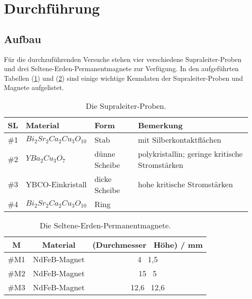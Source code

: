 \section{Durchf\"uhrung}
\label{sec:durchfuehrung}
\subsection{Aufbau}
F\"ur die durchzuf\"uhrenden Versuche stehen vier verschiedene Supraleiter-Proben und drei Seltene-Erden-Permanentmagnete zur Verf\"ugung.
In den aufgef\"uhrten Tabellen (\ref{tab:probenSL}) und (\ref{tab:probenM}) sind einige wichtige Kenndaten der Supraleiter-Proben und Magnete aufgelistet.
\begin{table}
	\centering
	\caption{Die Supraleiter-Proben.}
\begin{tabular}{|c|lll|}
	\hline
	{SL} & {Material} & {Form} & {Bemerkung} \\
	\hline
	\#1 & $Bi_2Sr_2Ca_2Cu_3O_10$ & Stab & mit Silberkontaktflächen \\
	\#2 & $YBa_2Cu_3O_7$ & d\"unne Scheibe & polykristallin; geringe kritische Stromstärken \\
	\#3 & YBCO-Einkristall & dicke Scheibe & hohe kritische Stromstärken \\
	\#4 & $Bi_2Sr_2Ca_2Cu_3O_10$ & Ring &  \\
	\hline
\end{tabular}
\label{tab:probenSL}
\end{table}
\begin{table}
	\centering
	\caption{Die Seltene-Erden-Permanentmagnete.}
\begin{tabular}{|c|cc|}
	\hline
	{M} & {Material} & {(Durchmesser \times \, H\"ohe) / mm} \\
	\hline
	\#M1 & NdFeB-Magnet & 4 \times \, 1,5 \\
	\#M2 & NdFeB-Magnet & 15 \times \, 5 \\
	\#M3 & NdFeB-Magnet & 12,6 \times \, 12,6 \\
	\hline
\end{tabular}
\label{tab:probenM}
\end{table}

